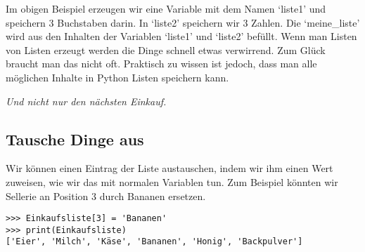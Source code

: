 Im obigen Beispiel erzeugen wir eine Variable mit dem Namen `liste1' und speichern 3 Buchstaben darin. In `liste2' speichern wir 3 Zahlen. Die `meine\_liste' wird aus den Inhalten der Variablen `liste1' und `liste2' befüllt. Wenn man Listen von Listen erzeugt werden die Dinge schnell etwas verwirrend. Zum Glück braucht man das nicht oft. Praktisch zu wissen ist jedoch, dass man alle möglichen Inhalte in Python Listen speichern kann.

\noindent
\emph{Und nicht nur den nächsten Einkauf.}

\subsection*{\color{BrickRed}Tausche Dinge aus}

Wir können einen Eintrag der Liste austauschen, indem wir ihm einen Wert zuweisen, wie wir das mit normalen Variablen tun. Zum Beispiel könnten wir Sellerie an Position 3 durch Bananen ersetzen.

\begin{Verbatim}[frame=single]
>>> Einkaufsliste[3] = 'Bananen'
>>> print(Einkaufsliste)
['Eier', 'Milch', 'Käse', 'Bananen', 'Honig', 'Backpulver']
\end{Verbatim}

